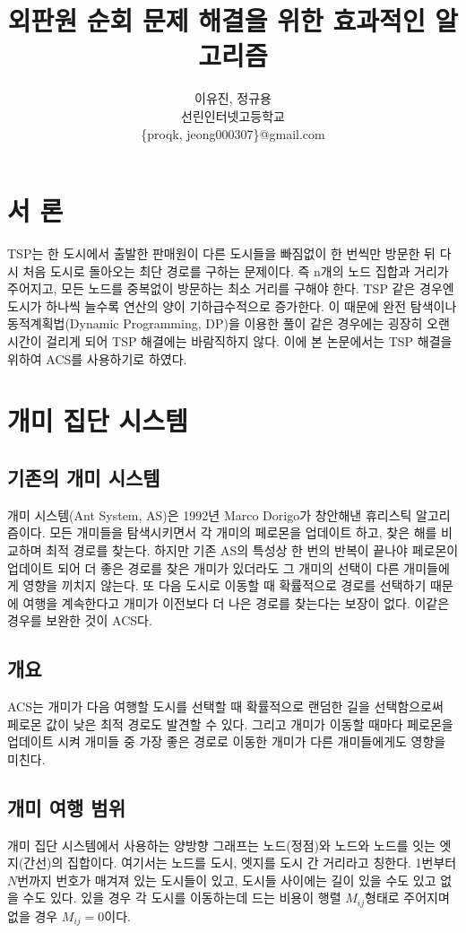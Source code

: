 \documentclass{kcc}
\title{외판원 순회 문제 해결을 위한 효과적인 알고리즘}
\author{
이유진, 정규용\\
선린인터넷고등학교 \\
\{proqk, jeong000307\}@gmail.com
}
\begin{document}
\maketitle

\section{서 론}
 TSP는 한 도시에서 출발한 판매원이 다른 도시들을 빠짐없이 한 번씩만 방문한 뒤 다시 처음 도시로 돌아오는 최단 경로를 구하는 문제이다. 즉 n개의 노드 집합과 거리가 주어지고, 모든 노드를 중복없이 방문하는 최소 거리를 구해야 한다. TSP 같은 경우엔 도시가 하나씩 늘수록 연산의 양이 기하급수적으로 증가한다. 이 때문에 완전 탐색이나 동적계획법(Dynamic Programming, DP)을 이용한 풀이 같은 경우에는 굉장히 오랜 시간이 걸리게 되어 TSP 해결에는 바람직하지 않다. 이에 본 논문에서는 TSP 해결을 위하여 ACS를 사용하기로 하였다.
  
\section{개미 집단 시스템}

\subsection{기존의 개미 시스템}
 개미 시스템(Ant System, AS)은 1992년 Marco Dorigo가 창안해낸 휴리스틱 알고리즘이다. 모든 개미들을 탐색시키면서 각 개미의 페로몬을 업데이트 하고, 찾은 해를 비교하며 최적 경로를 찾는다. 하지만 기존 AS의 특성상 한 번의 반복이 끝나야 페로몬이 업데이트 되어 더 좋은 경로를 찾은 개미가 있더라도 그 개미의 선택이 다른 개미들에게 영향을 끼치지 않는다. 또 다음 도시로 이동할 때 확률적으로 경로를 선택하기 때문에 여행을 계속한다고 개미가 이전보다 더 나은 경로를 찾는다는 보장이 없다. 이같은 경우를 보완한 것이 ACS다.

\subsection{개요}
 ACS는 개미가 다음 여행할 도시를 선택할 때 확률적으로 랜덤한 길을 선택함으로써 페로몬 값이 낮은 최적 경로도 발견할 수 있다. 그리고 개미가 이동할 때마다 페로몬을 업데이트 시켜 개미들 중 가장 좋은 경로로 이동한 개미가 다른 개미들에게도 영향을 미친다.

\subsection{개미 여행 범위}
 개미 집단 시스템에서 사용하는 양방향 그래프는 노드(정점)와 노드와 노드를 잇는 엣지(간선)의 집합이다. 여기서는 노드를 도시, 엣지를 도시 간 거리라고 칭한다. 1번부터 $N$번까지 번호가 매겨져 있는 도시들이 있고, 도시들 사이에는 길이 있을 수도 있고 없을 수도 있다. 있을 경우 각 도시를 이동하는데 드는 비용이 행렬 $M_{ij}$형태로 주어지며 없을 경우 $M_{ij}=0$이다.
 
\end{document}

